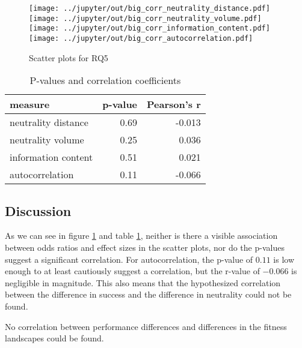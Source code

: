 \begin{figure}[h]
	\texttt{[image: ../jupyter/out/big\_corr\_neutrality\_distance.pdf]}
	\texttt{[image: ../jupyter/out/big\_corr\_neutrality\_volume.pdf]}
	\texttt{[image: ../jupyter/out/big\_corr\_information\_content.pdf]}
	\texttt{[image: ../jupyter/out/big\_corr\_autocorrelation.pdf]}
	\caption{Scatter plots for RQ5}\label{fig:rq5}
\end{figure}

\begin{table}[h]
	\caption{P-values and correlation coefficients}\label{table:correlations}
	\begin{center}
		\begin{tabular}{lrr}\toprule
			measure & p-value & Pearson's r\\
			\midrule
			neutrality distance & 0.69 & -0.013\\
			neutrality volume & 0.25 & 0.036\\
			information content & 0.51 & 0.021\\
			autocorrelation & 0.11 & -0.066\\
			\bottomrule
		\end{tabular}
	\end{center}
\end{table}

\subsection{Discussion}

As we can see in figure \ref{fig:rq5} and table \ref{table:correlations}, neither is there a visible association between odds ratios and effect sizes in the scatter plots, nor do the p-values suggest a significant correlation.
For autocorrelation, the p-value of $0.11$ is low enough to at least cautiously suggest a correlation, but the r-value of $-0.066$ is negligible in magnitude.
This also means that the hypothesized correlation between the difference in success and the difference in neutrality could not be found.

\begin{mdframed}[style=box, frametitle={Summary RQ5:}]
	No correlation between performance differences and differences in the fitness landscapes could be found.
\end{mdframed}